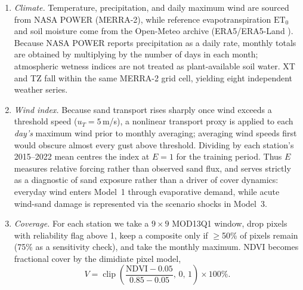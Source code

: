 \documentclass{mcmthesis}
\begin{document}
\begin{enumerate}

\item \emph{Climate.} Temperature, precipitation, and daily maximum wind are sourced from NASA POWER (MERRA-2), while reference evapotranspiration $\mathrm{ET}_0$ and soil moisture come from the Open-Meteo archive (ERA5/ERA5-Land \cite{EN10}). Because NASA POWER reports precipitation as a daily rate, monthly totals are obtained by multiplying by the number of days in each month; atmospheric wetness indices are not treated as plant-available soil water. XT and TZ fall within the same MERRA-2 grid cell, yielding eight independent weather series.

\item \emph{Wind index.} Because sand transport rises sharply once wind exceeds a threshold speed ($u_T=5$\,m/s), a nonlinear transport proxy is applied to each \emph{day's} maximum wind prior to monthly averaging; averaging wind speeds first would obscure almost every gust above threshold. Dividing by each station's 2015--2022 mean centres the index at $E=1$ for the training period. Thus $E$ measures relative forcing rather than observed sand flux, and serves strictly as a diagnostic of sand exposure rather than a driver of cover dynamics: everyday wind enters Model~1 through evaporative demand, while acute wind-sand damage is represented via the scenario shocks in Model~3.

\item \emph{Coverage.} For each station we take a $9\times9$ MOD13Q1 window, drop pixels with reliability flag above 1, keep a composite only if $\ge$50\% of pixels remain (75\% as a sensitivity check), and take the monthly maximum. NDVI becomes fractional cover by the dimidiate pixel model,
\begin{equation}
  V = \operatorname{clip}\!\left(\frac{\mathrm{NDVI}-0.05}{0.85-0.05},\,0,\,1\right)\times100\%.
\end{equation}
\end{enumerate}
\end{document}
